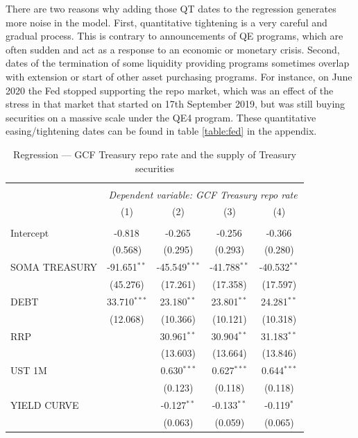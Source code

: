 \documentclass[11pt,a4paper,english,oneside]{article}
\begin{document}
There are two reasons why adding those QT dates to the regression generates more noise in the model. First, quantitative tightening is a very careful and gradual process. This is contrary to announcements of QE programs, which are often sudden and act as a response to an economic or monetary crisis. Second, dates of the termination of some liquidity providing programs sometimes overlap with extension or start of other asset purchasing programs. For instance, on June 2020 the Fed stopped supporting the repo market, which was an effect of the stress in that market that started on 17th September 2019, but was still buying securities on a massive scale under the QE4 program. These quantitative easing/tightening dates can be found in table \ref{table:fed} in the appendix.

\begin{table}[!htbp] \centering
\caption{Regression --- GCF Treasury repo rate and the supply of Treasury securities}
\begin{tabular}{@{\extracolsep{5pt}}lcccc}
\\[-1.8ex]\hline
\hline \\[-1.8ex]
& \multicolumn{4}{c}{\textit{Dependent variable: GCF Treasury repo rate}} \
\cr \cline{4-5}
\\[-1.8ex] & (1) & (2) & (3) & (4) \\
\hline \\[-1.8ex]
 Intercept & -0.818$^{}$ & -0.265$^{}$ & -0.256$^{}$ & -0.366$^{}$ \\
  & (0.568) & (0.295) & (0.293) & (0.280) \\
 SOMA TREASURY & -91.651$^{**}$ & -45.549$^{***}$ & -41.788$^{**}$ & -40.532$^{**}$ \\
  & (45.276) & (17.261) & (17.358) & (17.597) \\
 DEBT & 33.710$^{***}$ & 23.180$^{**}$ & 23.801$^{**}$ & 24.281$^{**}$ \\
  & (12.068) & (10.366) & (10.121) & (10.318) \\
 RRP & & 30.961$^{**}$ & 30.904$^{**}$ & 31.183$^{**}$ \\
  & & (13.603) & (13.664) & (13.846) \\
 UST 1M & & 0.630$^{***}$ & 0.627$^{***}$ & 0.644$^{***}$ \\
  & & (0.123) & (0.118) & (0.118) \\
 YIELD CURVE & & -0.127$^{**}$ & -0.133$^{**}$ & -0.119$^{*}$ \\
  & & (0.063) & (0.059) & (0.065) \\

\end{tabular}
\end{table}
\end{document}
